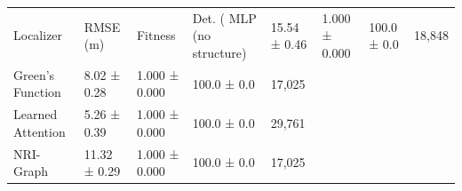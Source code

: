 \begin{tabular}{lllll}
\toprule
Localizer & RMSE (m) & Fitness & Det. (%
\midrule
MLP (no structure) & 15.54 ± 0.46 & 1.000 ± 0.000 & 100.0 ± 0.0 & 18,848 \\
Green's Function & 8.02 ± 0.28 & 1.000 ± 0.000 & 100.0 ± 0.0 & 17,025 \\
Learned Attention & 5.26 ± 0.39 & 1.000 ± 0.000 & 100.0 ± 0.0 & 29,761 \\
NRI-Graph & 11.32 ± 0.29 & 1.000 ± 0.000 & 100.0 ± 0.0 & 17,025 \\
\bottomrule
\end{tabular}
